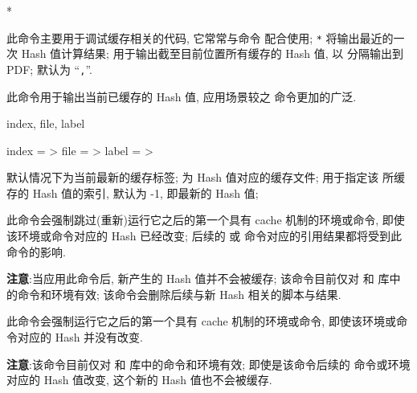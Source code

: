 \documentclass[
  hyper, 
  lang = cn, 
  class = l3doc,
  classOption={11pt},
  sect = {load=false},
]{../../zlatex/code/ztex}
\begin{document}
\begin{function}[added=2025-05-15]{\ztikzHashCurrent}
  \begin{syntax}
    *
  \end{syntax}
  此命令主要用于调试缓存相关的代码, 它常常与命令  配合使用;
  \texttt{*} 将输出最近的一次 Hash 值计算结果;
  \texttt{} 用于输出截至目前位置所有缓存的 Hash 值, 
  以  分隔输出到 PDF;  默认为 ``\texttt{,}''.
\end{function}


\begin{function}[added=2025-05-29, EXP]{\ztikzCachedHash}
  \begin{syntax}
  \end{syntax}
  此命令用于输出当前已缓存的 Hash 值, 应用场景较之  命令更加的广泛.
\end{function}


\begin{keyval}[parent=ztikz/cache/hash]{index, file, label}
  \begin{syntax}
    index = >
    file  = >
    label = >
  \end{syntax}
   默认情况下为当前最新的缓存标签;  为 Hash 值对应的缓存文件;
   用于指定该  所缓存的 Hash 值的索引, 默认为 -1, 即最新的 Hash 值;
\end{keyval}


\begin{function}[added=2025-05-15]{\ztikzForceToSkip}
  此命令会强制跳过(重新)运行它之后的第一个具有 cache 机制的环境或命令, 即使该环境或命令对应的 Hash 已经改变; 
  后续的  或  命令对应的引用结果都将受到此命令的影响. \par 
  \textbf{注意}:当应用此命令后, 新产生的 Hash 值并不会被缓存; 该命令目前仅对  和 
  库中的命令和环境有效; 该命令会删除后续与{\sffamily\color{red}新} Hash 相关的脚本与结果.
\end{function}


\begin{function}[added=2025-05-21]{\ztikzForceToRun}
  此命令会强制运行它之后的第一个具有 cache 机制的环境或命令, 即使该环境或命令对应的 Hash 并没有改变.\par
  \textbf{注意}:该命令目前仅对  和  库中的命令和环境有效; 即使是该命令后续的
  命令或环境对应的 Hash 值改变, 这个新的 Hash 值也不会被缓存.
\end{function}
\end{document}
